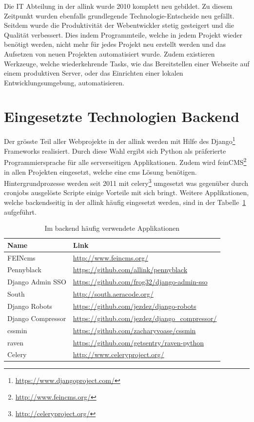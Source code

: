 
Die IT Abteilung in der allink wurde 2010 komplett neu gebildet. Zu diesem Zeitpunkt wurden ebenfalls grundlegende Technologie-Entscheide neu gefällt. Seitdem wurde die Produktivität der Webentwickler stetig gesteigert und die Qualität verbessert. Dies indem Programmteile, welche in jedem Projekt wieder benötigt werden, nicht mehr für jedes Projekt neu erstellt werden und das Aufsetzen von neuen Projekten automatisiert wurde. Zudem existieren Werkzeuge, welche wiederkehrende Tasks, wie das Bereitstellen einer Webseite auf einem produktiven Server, oder das Einrichten einer lokalen Entwicklungsumgebung, automatisieren.

\section{Eingesetzte Technologien Backend}
\label{sec:eingesetzte_technologien_backend}
Der grösste Teil aller Webprojekte in der allink werden mit Hilfe des Django\footnote{\url{https://www.djangoproject.com/}} Frameworks realisiert. Durch diese Wahl ergibt sich Python als präferierte Programmiersprache für alle serverseitigen Applikationen. Zudem wird feinCMS\footnote{\url{http://www.feincms.org/}} in allen Projekten eingesetzt, welche eine \acrshort{cms} Lösung benötigen. Hintergrundprozesse werden seit 2011 mit celery\footnote{\url{http://celeryproject.org/}} umgesetzt was gegenüber durch cronjobs ausgelöste Scripte einige Vorteile mit sich bringt. Weitere Applikationen, welche backendseitig in der allink häufig eingesetzt werden, sind in der Tabelle~\ref{tab:backend_applications} aufgeführt.

\begin{table}[ht]
  \centering
  \begin{tabular}{ll}
  \toprule
    Name & Link\\
  \midrule
    FEINcms & \url{http://www.feincms.org/}\\
  \midrule
    Pennyblack & \url{https://github.com/allink/pennyblack}\\
  \midrule
    Django Admin SSO & \url{https://github.com/frog32/django-admin-sso}\\
  \midrule
    South & \url{http://south.aeracode.org/}\\
  \midrule
    Django Robots & \url{https://github.com/jezdez/django-robots}\\
  \midrule
    Django Compressor & \url{https://github.com/jezdez/django_compressor/}\\
  \midrule
    cssmin & \url{https://github.com/zacharyvoase/cssmin}\\
  \midrule
    raven & \url{https://github.com/getsentry/raven-python}\\
  \midrule
    Celery & \url{http://www.celeryproject.org/}\\
  \bottomrule
  \end{tabular}
  \caption{Im backend häufig verwendete Applikationen}
  \label{tab:backend_applications}
\end{table}

